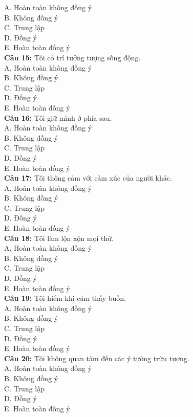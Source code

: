 \begin{multicols}{2}
A. Hoàn toàn không đồng ý \\
B. Không đồng ý \\
C. Trung lập \\
D. Đồng ý \\
E. Hoàn toàn đồng ý \\
\textbf{Câu 15:} Tôi có trí tưởng tượng sống động. \\
A. Hoàn toàn không đồng ý \\
B. Không đồng ý \\
C. Trung lập \\
D. Đồng ý \\
E. Hoàn toàn đồng ý \\
\textbf{Câu 16:} Tôi giữ mình ở phía sau. \\
A. Hoàn toàn không đồng ý \\
B. Không đồng ý \\
C. Trung lập \\
D. Đồng ý \\
E. Hoàn toàn đồng ý \\
\textbf{Câu 17:} Tôi thông cảm với cảm xúc của người khác. \\
A. Hoàn toàn không đồng ý \\
B. Không đồng ý \\
C. Trung lập \\
D. Đồng ý \\
E. Hoàn toàn đồng ý \\
\textbf{Câu 18:} Tôi làm lộn xộn mọi thứ. \\
A. Hoàn toàn không đồng ý \\
B. Không đồng ý \\
C. Trung lập \\
D. Đồng ý \\
E. Hoàn toàn đồng ý \\
\textbf{Câu 19:} Tôi hiếm khi cảm thấy buồn. \\
A. Hoàn toàn không đồng ý \\
B. Không đồng ý \\
C. Trung lập \\
D. Đồng ý \\
E. Hoàn toàn đồng ý \\
\textbf{Câu 20:} Tôi không quan tâm đến các ý tưởng trừu tượng. \\
A. Hoàn toàn không đồng ý \\
B. Không đồng ý \\
C. Trung lập \\
D. Đồng ý \\
E. Hoàn toàn đồng ý \\

\end{multicols}
